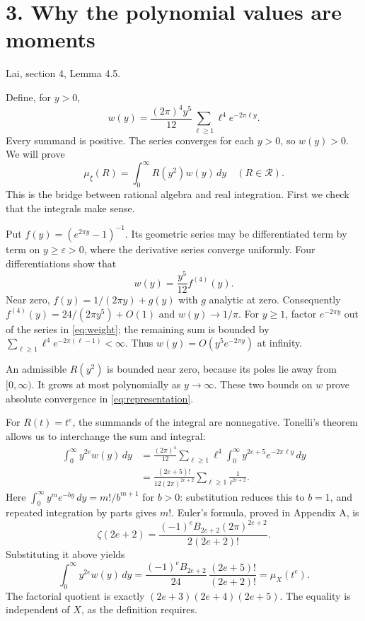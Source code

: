 \documentclass[11pt]{article}
\newcommand{\dd}{\,d}
\newcommand{\source}[1]{{\small\color{blue!45!black}#1}\par}
\newcommand{\heading}[2]{\section*{#1}\source{#2}}
\begin{document}
\newpage
\heading{3. Why the polynomial values are moments}{Lai, section 4, Lemma 4.5.}
Define, for $y>0$,
\begin{equation}\label{eq:weight}
 w(y)=\frac{(2\pi)^4y^5}{12}
       \sum_{\ell\geq1}\ell^4e^{-2\pi\ell y}.
\end{equation}
Every summand is positive. The series converges for each $y>0$, so
$w(y)>0$. We will prove
\begin{equation}\label{eq:representation}
 \boxed{\mu_\xi(R)=\int_0^\infty R(y^2)w(y)\dd y
        \quad(R\in\mathcal R).}
\end{equation}
This is the bridge between rational algebra and real integration.
First we check that the integrals make sense.

Put $f(y)=(e^{2\pi y}-1)^{-1}$. Its geometric series may be differentiated
term by term on $y\geq\varepsilon>0$, where the derivative series converge
uniformly. Four differentiations show that
\[
 w(y)=\frac{y^5}{12}f^{(4)}(y).
\]
Near zero, $f(y)=1/(2\pi y)+g(y)$ with $g$ analytic at zero. Consequently
$f^{(4)}(y)=24/(2\pi y^5)+O(1)$ and $w(y)\to1/\pi$.
For $y\geq1$, factor $e^{-2\pi y}$ out of the series in \eqref{eq:weight};
the remaining sum is bounded by
$\sum_{\ell\geq1}\ell^4e^{-2\pi(\ell-1)}<\infty$.
Thus $w(y)=O(y^5e^{-2\pi y})$ at infinity.

An admissible $R(y^2)$ is bounded near zero, because its poles lie away from
$[0,\infty)$. It grows at most polynomially as $y\to\infty$.
These two bounds on $w$ prove absolute convergence in
\eqref{eq:representation}.

For $R(t)=t^e$, the summands of the integral are nonnegative. Tonelli's
theorem allows us to interchange the sum and integral:
\begin{align*}
 \int_0^\infty y^{2e}w(y)\dd y
 &=\frac{(2\pi)^4}{12}\sum_{\ell\geq1}\ell^4
      \int_0^\infty y^{2e+5}e^{-2\pi\ell y}\dd y\\
 &=\frac{(2e+5)!}{12(2\pi)^{2e+2}}
      \sum_{\ell\geq1}\frac1{\ell^{2e+2}}.
\end{align*}
Here $\int_0^\infty y^m e^{-by}\dd y=m!/b^{m+1}$ for $b>0$:
substitution reduces this to $b=1$, and repeated integration by parts gives
$m!$. Euler's formula, proved in Appendix A, is
\[
 \zeta(2e+2)=
 \frac{(-1)^eB_{2e+2}(2\pi)^{2e+2}}{2(2e+2)!}.
\]
Substituting it above yields
\[
 \int_0^\infty y^{2e}w(y)\dd y
 =\frac{(-1)^eB_{2e+2}}{24}\,
       \frac{(2e+5)!}{(2e+2)!}
 =\mu_X(t^e).
\]
The factorial quotient is exactly $(2e+3)(2e+4)(2e+5)$.
The equality is independent of $X$, as the definition requires.
\end{document}
